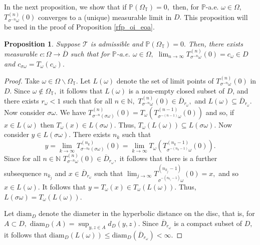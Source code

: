 \documentclass[12pt,reqno]{amsart}
\numberwithin{theorem}{section}
\newtheorem{proposition}[theorem]{Proposition}%
\begin{document}
In the next proposition, we show that if $\mathbb{P}(\Omega_{\mathbb{T}})=0,$ then, for $\mathbb{P}$-a.e. $\omega\in\Omega,$ $T_{\sigma^{-n}\omega}^{(n)}(0)$ converges to a (unique) measurable limit in $D.$ This proposition will be used in the proof of Proposition \ref{rfp_oi_eoa}.
\begin{proposition}\label{no_circle_pt}
    Suppose $\mathcal{T}$ is admissible and $\mathbb{P}(\Omega_{\mathbb{T}})=0.$ Then, there exists measurable $c:\Omega\to\overline{D}$ such that for $\mathbb{P}$-a.e. $\omega\in\Omega,$ $\lim_{n\to\infty}T^{(n)}_{\sigma^{-n}\omega}(0)=c_{\omega}\in D$ and $c_{\sigma\omega}=T_{\omega}(c_{\omega}).$ 
\end{proposition}
\begin{proof}
    Take $\omega\in\Omega\backslash\Omega_{\mathbb{T}}.$ Let $L(\omega)$ denote the set of limit points of $T_{\sigma^{-n}\omega}^{(n)}(0)$ in $D.$ Since $\omega\not\in\Omega_{\mathbb{T}},$ it follows that $L(\omega)$ is a non-empty closed subset of $D$, and there exists $r_{\omega}<1$ such that for all $n\in\mathbb{N},$ $T_{\sigma^{-n}\omega}^{(n)}(0)\in\overline{D}_{r_{\omega}},$ and $L(\omega)\subseteq\overline{D}_{r_{\omega}}.$ Now consider $\sigma\omega.$ We have $T_{\sigma^{-n}(\sigma\omega)}^{(n)}(0)=T_{\omega}(T_{\sigma^{-(n-1)}\omega}^{(n-1)}(0))$ and so, if $x\in L(\omega)$ then $T_{\omega}(x)\in L(\sigma\omega).$  Thus, $T_{\omega}(L(\omega))\subseteq L(\sigma\omega).$ Now consider $y\in L(\sigma\omega).$ There exists $n_k$ such that $$y=\lim_{k\to\infty}T_{\sigma^{-n_k}(\sigma\omega)}^{(n_k)}(0)=\lim_{k\to\infty}T_{\omega}(T_{\sigma^{-(n_k-1)}\omega}^{(n_k-1)}(0)).$$ Since for all $n\in\mathbb{N}$ $T_{\sigma^{-n}\omega}^{(n)}(0)\in\overline{D}_{r_{\omega}},$ it follows that there is a further subsequence $n_{k_j}$ and $x\in\overline{D}_{r_{\omega}}$ such that $\lim_{j\to\infty}T_{\sigma^{-(n_{k_j}-1)}\omega}^{(n_{k_j}-1)}(0)=x,$ and so $x\in L(\omega).$ It follows that $y=T_{\omega}(x)\in T_{\omega}(L(\omega)).$ Thus, $L(\sigma\omega)=T_{\omega}(L(\omega)).$ 

    Let $\text{diam}_D$ denote the diameter in the hyperbolic distance on the disc, that is, for $A\subset D,$ $\text{diam}_D(A)=\sup_{y,z\in A}d_{D}(y,z).$ Since $\overline{D}_{r_\omega}$ is a compact subset of $D,$ it follows that $\text{diam}_D(L(\omega))\le\text{diam}_{D}(\overline{D}_{r_{\omega}})<\infty.$ 
    

\end{proof}
\end{document}
